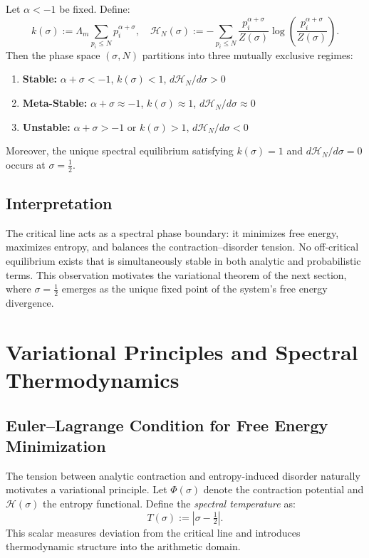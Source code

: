 \documentclass[12pt]{article}
\begin{document}
\begin{theorem}
\label{thm:tensor_phase}
Let $\alpha < -1$ be fixed. Define:
\[
k(\sigma) := \Lambda_m \sum_{p_i \le N} p_i^{\alpha + \sigma}, \quad
\mathcal{H}_N(\sigma) := -\sum_{p_i \le N} \frac{p_i^{\alpha + \sigma}}{Z(\sigma)} \log \left( \frac{p_i^{\alpha + \sigma}}{Z(\sigma)} \right).
\]
Then the phase space $(\sigma, N)$ partitions into three mutually exclusive regimes:
\begin{enumerate}
    \item \textbf{Stable:} $\alpha + \sigma < -1$, $k(\sigma) < 1$, $d\mathcal{H}_N/d\sigma > 0$
    \item \textbf{Meta-Stable:} $\alpha + \sigma \approx -1$, $k(\sigma) \approx 1$, $d\mathcal{H}_N/d\sigma \approx 0$
    \item \textbf{Unstable:} $\alpha + \sigma > -1$ or $k(\sigma) > 1$, $d\mathcal{H}_N/d\sigma < 0$
\end{enumerate}
Moreover, the unique spectral equilibrium satisfying $k(\sigma) = 1$ and $d\mathcal{H}_N/d\sigma = 0$ occurs at $\sigma = \tfrac{1}{2}$.
\end{theorem}

\subsection*{Interpretation}

The critical line acts as a spectral phase boundary: it minimizes free energy, maximizes entropy, and balances the contraction–disorder tension. No off-critical equilibrium exists that is simultaneously stable in both analytic and probabilistic terms. This observation motivates the variational theorem of the next section, where $\sigma = \tfrac{1}{2}$ emerges as the unique fixed point of the system's free energy divergence.


\section{Variational Principles and Spectral Thermodynamics}

\subsection{Euler--Lagrange Condition for Free Energy Minimization}

The tension between analytic contraction and entropy-induced disorder naturally motivates a variational principle. Let $\Phi(\sigma)$ denote the contraction potential and $\mathcal{H}(\sigma)$ the entropy functional. Define the \emph{spectral temperature} as:
\[
T(\sigma) := \left| \sigma - \tfrac{1}{2} \right|.
\]
This scalar measures deviation from the critical line and introduces thermodynamic structure into the arithmetic domain.
\end{document}
